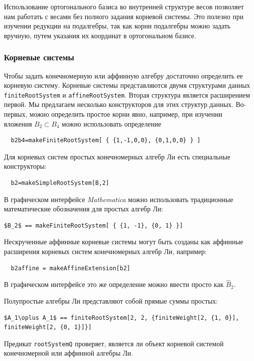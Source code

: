 Использование ортогонального базиса во внутренней структуре весов позволяет нам работать с весами без полного задания корневой системы. Это полезно при изучении редукции на подалгебры, так как корни подалгебры можно задать вручную, путем указания их координат в ортогональном базисе.

\subsubsection{Корневые системы}
\label{sec:root-systems}

Чтобы задать конечномерную или аффинную алгебру достаточно определить ее корневую систему. Корневые системы представляются двумя структурами данных \lstinline{finiteRootSystem} и \lstinline{affineRootSystem}. Вторая структура является расширением первой. Мы предлагаем несколько конструкторов для этих структур данных. Во-первых, можно определить простое корни явно, например, при изучении вложения $B_2\subset B_4$ можно использовать определение
\begin{lstlisting}
  b2b4=makeFiniteRootSystem[ { {1,-1,0,0}, {0,1,0,0} } ]
\end{lstlisting}
Для корневых систем простых конечномерных алгебр Ли есть специальные конструкторы:
\begin{lstlisting}
  b2=makeSimpleRootSystem[B,2]
\end{lstlisting}
В графическом интерфейсе {\it Mathematica} можно использовать традиционные математические обозначения для простых алгебр Ли:


\begin{lstlisting}[mathescape=true]
  $B_2$ == makeFiniteRootSystem[ { {1, -1}, {0, 1} }]
\end{lstlisting}

Нескрученные аффинные корневые системы могут быть созданы как аффинные расширения корневых систем конечномерных алгебр Ли, например:
\begin{lstlisting}
  b2affine = makeAffineExtension[b2]
\end{lstlisting}
В графическом интерфейсе это же определение можно ввести просто как $\hat{B}_2$.

Полупростые алгебры Ли представляют собой прямые суммы простых:
\begin{lstlisting}[mathescape=true]
  $A_1\oplus A_1$ == finiteRootSystem[2, 2, {finiteWeight[2, {1, 0}], finiteWeight[2, {0, 1}]}]
\end{lstlisting}

Предикат \lstinline{rootSystemQ} проверяет, является ли объект корневой системой конечномерной или аффинной алгебры Ли.

